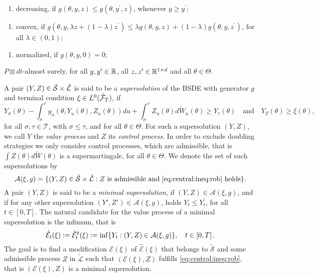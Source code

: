 \documentclass[DIV=classic,a4paper]{artclcomp}
\begin{document}
\begin{enumerate}[label=\textsc{(Mon${}^\prime$)},leftmargin=40pt]
	\item \label{cond02} decreasing, if $g\left(\theta,y,z  \right)\leq g\left( \theta, y^\prime ,z\right)$, whenever $y\geq y^\prime$; 
\end{enumerate}
\begin{enumerate}[label=\textsc{(Con)},leftmargin=40pt]
	\item \label{cond01} convex, if $g\left(\theta,y,\lambda z+\left( 1-\lambda \right)z^\prime \right)\leq \lambda g\left( \theta, y,z \right)+\left( 1-\lambda \right)g\left( \theta, y,z^\prime \right)$, for all $\lambda \in \left( 0,1 \right)$;
\end{enumerate}
\begin{enumerate}[label=\textsc{(Nor)},leftmargin=40pt]
	\item \label{cond04} normalized, if $g\left(\theta,y,0 \right)=0$;
\end{enumerate}
$P\otimes dt$-almost surely, for all $y,y'\in\mathbb{R}$, all $z,z^\prime  \in \mathbb{R}^{1 \times d}$ and all $\theta \in \Theta$.

A pair $(Y,Z)\in\tilde{{\cal S}}\times \tilde{\mathcal{L}}$ is said to be a \emph{supersolution} of the BSDE with generator $g$ and terminal condition $\xi\in L^0(\tilde{\cal F}_T)$, if
\begin{equation}\label{eq:central:ineq:rob}
	Y_\sigma(\theta)-\int_\sigma^\tau g_{u}(\theta,Y_u(\theta),Z_u(\theta))du+\int_\sigma^\tau Z_{u}(\theta) d\tilde{W}_{u}(\theta) \geq Y_\tau(\theta)\quad\text{and} \quad Y_T(\theta)\geq\xi(\theta),
\end{equation}
for all $\sigma,\tau \in \mathcal{T}$, with $\sigma\leq \tau$, and for all $\theta \in \Theta$.
For such a supersolution $(Y,Z)$, we call $Y$ the \emph{value process} and $Z$ its \emph{control process}.
In order to exclude doubling strategies we only consider control processes, which are admissible, that is $\int Z(\theta)d\tilde W(\theta)$ is a supermartingale, for all $\theta\in\Theta$.
We denote the set of such supersolutions by
\begin{equation}\label{set:rob:A:B}
	\mathcal{A}(\xi,g)=  \{  (Y,Z) \in\tilde{\mathcal{S}}\times \tilde{\mathcal{L}} : Z \text{ is admissible and } \eqref{eq:central:ineq:rob} \text{ holds} \} .
\end{equation}
A pair $(Y,Z)$ is said to be a \emph{minimal supersolution}, if $(Y,Z)\in \mathcal{A}(\xi,g)$, and if for any other supersolution $(Y',Z')\in\mathcal{A}(\xi,g)$, holds $Y_t \leq Y^{\prime}_t$, for all $t\in[0,T]$. 
The natural candidate for the value process of a minimal supersolution is the infimum, that is
\begin{equation}
	\hat{\mathcal{E}}_t(\xi):=\hat{\mathcal{E}}^{g}_t(\xi):=\inf  \{ Y_t : \left( Y,Z \right)\in \mathcal{A}(\xi,g) \} , \quad t \in \left[ 0,T \right].
	\label{eq:defi:phi:rob1:B}
\end{equation}
The goal is to find a modification $\mathcal{E}(\xi)$ of $\hat{\mathcal{E}}(\xi)$ that belongs to $\tilde{\mathcal{S}}$ and some admissible process $Z$ in $\tilde{\mathcal{L}}$ such that $(\mathcal{E}(\xi), Z)$ fulfills \eqref{eq:central:ineq:rob}, that is $(\mathcal{E}(\xi),Z)$ is a minimal supersolution.
\end{document}
